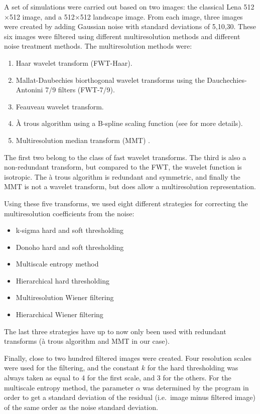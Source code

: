  A set of simulations were carried out based on two images: the classical
Lena 512$\times$512 image, and a 512$\times$512 landscape image. From each 
image, three
images were created  by adding Gaussian noise with standard deviations
of 5,10,30. These six images were filtered using different 
multiresolution methods and different noise treatment methods.
The multiresolution methods were:
\begin{enumerate}
\item Haar wavelet transform (FWT-Haar).
\item Mallat-Daubechies biorthogonal wavelet transforms using the 
Dauchechies-Antonini 7/9 filters \cite{wave:antonini92} (FWT-7/9).
\item Feauveau wavelet transform.
\item \`A trous algorithm using a B-spline scaling function (see
 \cite{starck:sta95_1,starck:book98} for more details).
\item Multiresolution median transform (MMT) \cite{starck:sta96_2}.
\end{enumerate}
The first two belong to the class of fast wavelet transforms.
The third is also a non-redundant transform, but compared to the FWT,
the wavelet function is isotropic. The \`a trous algorithm is redundant and
symmetric, and finally the MMT is not a wavelet transform, but does allow 
a multiresolution representation.

Using these five transforms, we used eight different strategies 
for correcting the multiresolution coefficients from the noise:
\begin{itemize}
\item k-sigma hard and soft  thresholding
\item Donoho hard and soft thresholding
\item Multiscale entropy method
\item Hierarchical hard thresholding
\item Multiresolution Wiener filtering
\item Hierarchical Wiener filtering
\end{itemize}
The last three strategies have up to now only been used  with 
redundant transforms (\`a trous algorithm and MMT in our case).

Finally, close to two hundred filtered images were created. 
Four resolution scales were used for the filtering, and the constant $k$ for
the hard thresholding was always taken as equal to 4 for the first scale,
and 3 for the others. For the multiscale entropy method, the parameter 
$\alpha$ was determined by the program in order to get a standard deviation
of the residual (i.e.\ image minus filtered image) of the same order as the
noise standard deviation.

